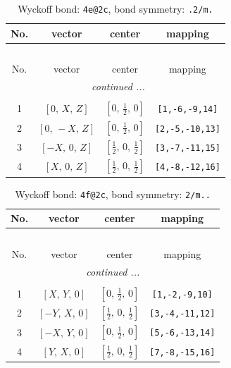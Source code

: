 \documentclass[fleqn,8pt]{jsarticle}
\begin{document}
\renewcommand{\arraystretch}{1.2}
\begin{longtable}{cccc}
\caption{Wyckoff bond: {\tt 4e@2c}, bond symmetry: {\tt .2/m.}}
 \\
 \hline \hline
No. & vector & center & mapping \\ \hline \endfirsthead

\multicolumn{3}{l}{\tablename\ \thetable{}} \\
 \hline \hline
No. & vector & center & mapping \\ \hline \endhead

 \hline \hline
\multicolumn{3}{r}{\footnotesize\it continued ...} \\ \endfoot

 \hline \hline
\multicolumn{3}{r}{} \\ \endlastfoot

1 & $\left[ 0,\, X,\, Z \right]$ & $\left[ 0,\, \frac{1}{2},\, 0 \right]$ & {\tt [1,-6,-9,14]} \\ \hline
2 & $\left[ 0,\, - X,\, Z \right]$ & $\left[ 0,\, \frac{1}{2},\, 0 \right]$ & {\tt [2,-5,-10,13]} \\ \hline
3 & $\left[ - X,\, 0,\, Z \right]$ & $\left[ \frac{1}{2},\, 0,\, \frac{1}{2} \right]$ & {\tt [3,-7,-11,15]} \\ \hline
4 & $\left[ X,\, 0,\, Z \right]$ & $\left[ \frac{1}{2},\, 0,\, \frac{1}{2} \right]$ & {\tt [4,-8,-12,16]} \\
\end{longtable}
\renewcommand{\arraystretch}{1.2}
\begin{longtable}{cccc}
\caption{Wyckoff bond: {\tt 4f@2c}, bond symmetry: {\tt 2/m..}}
 \\
 \hline \hline
No. & vector & center & mapping \\ \hline \endfirsthead

\multicolumn{3}{l}{\tablename\ \thetable{}} \\
 \hline \hline
No. & vector & center & mapping \\ \hline \endhead

 \hline \hline
\multicolumn{3}{r}{\footnotesize\it continued ...} \\ \endfoot

 \hline \hline
\multicolumn{3}{r}{} \\ \endlastfoot

1 & $\left[ X,\, Y,\, 0 \right]$ & $\left[ 0,\, \frac{1}{2},\, 0 \right]$ & {\tt [1,-2,-9,10]} \\ \hline
2 & $\left[ - Y,\, X,\, 0 \right]$ & $\left[ \frac{1}{2},\, 0,\, \frac{1}{2} \right]$ & {\tt [3,-4,-11,12]} \\ \hline
3 & $\left[ - X,\, Y,\, 0 \right]$ & $\left[ 0,\, \frac{1}{2},\, 0 \right]$ & {\tt [5,-6,-13,14]} \\ \hline
4 & $\left[ Y,\, X,\, 0 \right]$ & $\left[ \frac{1}{2},\, 0,\, \frac{1}{2} \right]$ & {\tt [7,-8,-15,16]} \\
\end{longtable}
\end{document}
